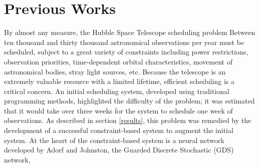 \documentclass[twoside,12pt,titlepage,a4paper]{article}
\begin{document}


\section{Previous Works}
\label{network}





By almost any measure, the Hubble Space Telescope scheduling problem
Between ten thousand and thirty thousand 
astronomical observations per year must be scheduled,
subject to a great
variety of constraints including
power restrictions, observation priorities,  
time-dependent orbital characteristics, 
movement of astronomical bodies, stray
light sources, etc. Because the telescope is an extremely
valuable resource with a limited lifetime, efficient scheduling
is a critical concern. An initial scheduling system, developed
using traditional programming methods,
highlighted the difficulty of the problem;
it was estimated that it would take over three
weeks for the system to schedule one
week of observations. As described in section \ref{results},
this problem was remedied by 
the development
of a successful constraint-based system to augment the initial system.
At the heart of the constraint-based system
is a neural network developed by Adorf and Johnston, 
the Guarded Discrete Stochastic (GDS) network,
\end{document}
